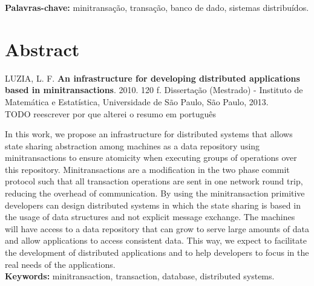 \documentclass[11pt,twoside,a4paper]{book}
\begin{document}
\noindent \textbf{Palavras-chave:} minitransação, transação, banco de dado, sistemas distribuídos.

\chapter*{Abstract}
\noindent LUZIA, L. F. \textbf{An infrastructure for developing distributed applications based in minitransactions}. 
2010. 120 f.
Dissertação (Mestrado) - Instituto de Matemática e Estatística,
Universidade de São Paulo, São Paulo, 2013.
\\
TODO reescrever por que alterei o resumo em português

In this work, we propose an infrastructure for distributed systems that allows
state sharing abstraction among machines as a data repository using minitransactions to ensure atomicity when executing groups of operations over 
this repository. Minitransactions are a modification in the two phase 
commit protocol such that all transaction operations are sent in one network round trip, reducing the overhead of communication. By using the 
minitransaction primitive developers can design distributed systems in which the state sharing is based in the usage of data structures and not 
explicit message exchange. The machines will have access to a data repository that can grow to serve large amounts of data and allow applications 
to access consistent data. This way, we expect to facilitate the development of
distributed applications and to help developers to focus in the real needs of
the applications.
\\

\noindent \textbf{Keywords:} minitransaction, transaction, database, distributed systems.

\tableofcontents

\end{document}

